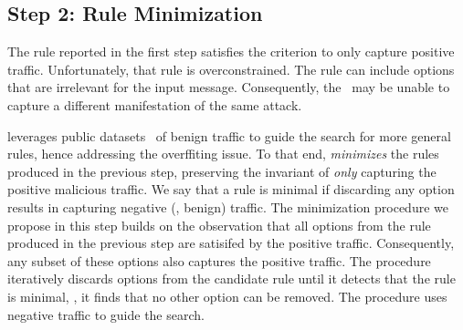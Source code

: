 \documentclass[sigconf,review, anonymous]{acmart}
\begin{document}
\subsection{Step 2: Rule Minimization}
\label{sec:minimization}

The rule reported in the first step satisfies the criterion to only
capture positive traffic. Unfortunately, that rule is overconstrained.
The rule can include options that are irrelevant for the input
message. Consequently, the \nids\ may be unable to capture a different
manifestation of the same attack.


\tname{} leverages public datasets~\cite{tcpreplay} of benign traffic
to guide the search for more general rules, hence addressing the
overffiting issue. To that end, \tname{} \emph{minimizes} the rules
produced in the previous step, preserving the invariant of \emph{only}
capturing the positive malicious traffic. We say that a rule is
minimal if discarding any option results in capturing negative (\ie{},
benign) traffic.  The minimization procedure we propose in this step
builds on the observation that all options from the rule produced in
the previous step are satisifed by the positive traffic. Consequently,
any subset of these options also captures the positive traffic. The
procedure iteratively discards options from the candidate rule until
it detects that the rule is minimal, \ie{}, it finds that no other
option can be removed. The procedure uses negative traffic to guide
the search.
\end{document}
